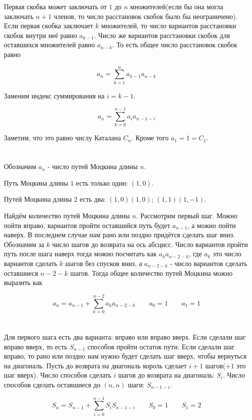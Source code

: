 \documentclass{article}
\begin{document}
Первая скобка может заключать от $1$ до $n$ множителей(если бы она могла
заключать $n+1$ членов, то число расстановок скобок было бы неограничено). Если
первая скобка заключает $k$ множителей, то число вариантов расстановки скобок
внутри неё равно $a_{k-1}$. Число же вариантов расстановки скобок для оставшихся
множителей равно $a_{n-k}$. То есть общее число расстановок скобок равно

$$a_n=\sum_{k=1}^{n}a_{k-1}a_{n-k}$$

Заменим индекс суммирования на $i=k-1$.

$$a_n=\sum_{k=0}^{n-1}a_ia_{n-1-i}$$

Заметим, что это равно числу Каталана $C_n$. Кроме того $a_1=1=C_1$.

\section{}

Обозначим $a_n$ - число путей Моцкина длины $n$.

Путь Моцкина длины $1$ есть только один: $(1,0)$.

Путей Моцкина длины $2$ есть два: $(1,0) (1,0)$; $(1,1) (1,-1)$.

Найдём количество путей Моцкина длины $n$. Рассмотрим первый шаг. Можно пойти
вправо, вариантов пройти оставшийся путь будет $a_{n-1}$, а можно пойти наверх.
В последнем случае нам рано или поздно придётся сделать шаг вниз. Обозначим за
$k$ число шагов до возврата на ось абсцисс. Число вариантов пройти путь после
шага наверх тогда можно посчитать как $a_ka_{n-2-k}$, где $a_k$ это число
вариантов сделать $k$ шагов без спусков вниз, а $a_{n-2-k}$ - число вариантов
сделать оставшиеся $n-2-k$ шагов. Тогда общее количество путей Моцкина можно
выразить как 

$$a_n=a_{n-1}+\sum_{k=0}^{n-2}a_ka_{n-2-k}\qquad a_0=1\qquad a_1=1$$

\section{}

Для первого шага есть два варианта: вправо или вправо вверх. Если сделали шаг
вправо вверх, то есть $S_{n-1}$ способов пройти остаток пути. Если сделали шаг
вправо, то рано или поздно нам нужно будет сделать шаг вверх, чтобы вернуться
на диагональ. Пусть до возврата на диагональ король сделает $i+1$ шагов($+1$
это шаг вверх). Число способов сделать $i$ шагов до возврата на диагональ:
$S_i$.  Число способов сделать оставшиеся до $(n,n)$ шаги: $S_{n-1-i}$.

$$S_n=S_{n-1}+\sum_{i=0}^{n-1}S_iS_{n-1-i}\qquad S_0=1\qquad S_1=2$$
\end{document}
